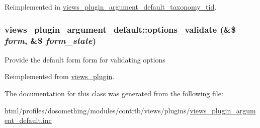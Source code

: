 Reimplemented in \hyperlink{classviews__plugin__argument__default__taxonomy__tid_a0bcf86a34e2d3a8600022b07c661ce05}{views\_\-plugin\_\-argument\_\-default\_\-taxonomy\_\-tid}.\hypertarget{classviews__plugin__argument__default_a39f9ba2c80352fe029e765771a7af3a5}{
\subsubsection[{options\_\-validate}]{\setlength{\rightskip}{0pt plus 5cm}views\_\-plugin\_\-argument\_\-default::options\_\-validate (\&\$ {\em form}, \/  \&\$ {\em form\_\-state})}}
\label{classviews__plugin__argument__default_a39f9ba2c80352fe029e765771a7af3a5}
Provide the default form form for validating options 

Reimplemented from \hyperlink{classviews__plugin_a46d72eb35feea36fed83cd1355a47431}{views\_\-plugin}.

The documentation for this class was generated from the following file:\begin{DoxyCompactItemize}
\item 
html/profiles/dosomething/modules/contrib/views/plugins/\hyperlink{views__plugin__argument__default_8inc}{views\_\-plugin\_\-argument\_\-default.inc}\end{DoxyCompactItemize}
